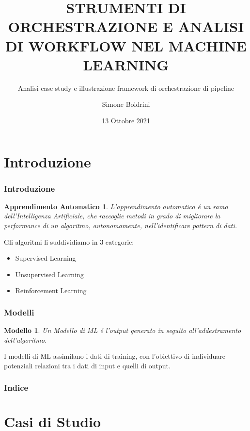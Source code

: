 \documentclass[xcolor=dvipsnames]{beamer}
\title[Machine Learning]{STRUMENTI DI ORCHESTRAZIONE E ANALISI DI WORKFLOW NEL MACHINE LEARNING}
\subtitle[]{Analisi case study e illustrazione framework di orchestrazione di pipeline}
\author{Simone Boldrini}
\date{13 Ottobre 2021}
\institute[]{Alma Mater Studiorum - Universitá di Bologna \\ Facoltá di Scienze}
\begin{document}
\begin{frame}
    \titlepage
\end{frame}


\section*{Introduzione}
\begin{frame}
    \frametitle{Introduzione}
    
    \newtheorem{Apprendimento Automatico}{Apprendimento Automatico}

    \begin{Apprendimento Automatico}
        L'\alert{apprendimento automatico} é un ramo dell'Intelligenza Artificiale, che raccoglie metodi in grado di migliorare la performance di un algoritmo, autonomamente, nell'identificare pattern di dati.
    \end{Apprendimento Automatico}
    Gli algoritmi li suddividiamo in 3 categorie:
    \begin{itemize}
        \item Supervised Learning
        \item Unsupervised Learning
        \item Reinforcement Learning
    \end{itemize}
\end{frame}
\begin{frame}
 \frametitle{Modelli} 
 \newtheorem{Modello}{Modello}
 \begin{Modello}
Un Modello di ML é l'output generato in seguito all'addestramento dell'algoritmo.
 \end{Modello}  
 I modelli di ML assimilano i dati di training, con l'obiettivo di individuare potenziali relazioni tra i dati di input e quelli di output.
\end{frame}



    \begin{frame}
    \frametitle{Indice}
    \tableofcontents[]
    \end{frame}
    \section{Casi di Studio}
\end{document}
